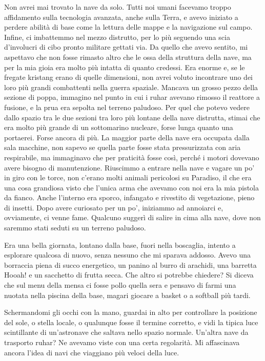 Non avrei mai trovato la nave da solo. Tutti noi umani facevamo troppo
affidamento sulla tecnologia avanzata, anche sulla Terra, e avevo
iniziato a perdere abilità di base come la lettura delle mappe e la
navigazione sul campo. Infine, ci imbattemmo nel mezzo distrutto, per lo
più seguendo una scia d'involucri di cibo pronto militare gettati via.
Da quello che avevo sentito, mi aspettavo che non fosse rimasto altro
che le ossa della struttura della nave, ma per la mia gioia era molto
più intatta di quanto credessi. Era enorme e, se le fregate kristang
erano di quelle dimensioni, non avrei voluto incontrare uno dei loro più
grandi combattenti nella guerra spaziale. Mancava un grosso pezzo della
sezione di poppa, immagino nel punto in cui i ruhar avevano rimosso il
reattore a fusione, e la prua era sepolta nel terreno paludoso. Per quel
che potevo vedere dallo spazio tra le due sezioni tra loro più lontane
della nave distrutta, stimai che era molto più grande di un sottomarino
nucleare, forse lunga quanto una portaerei. Forse ancora di più. La
maggior parte della nave era occupata dalla sala macchine, non sapevo se
quella parte fosse stata pressurizzata con aria respirabile, ma
immaginavo che per praticità fosse così, perché i motori dovevano avere
bisogno di manutenzione. Riuscimmo a entrare nella nave e vagare un po'
in giro con le torce, non c'erano molti animali pericolosi su Paradiso,
il che era una cosa grandiosa visto che l'unica arma che avevamo con noi
era la mia pistola da fianco. Anche l'interno era sporco, infangato e
rivestito di vegetazione, pieno di insetti. Dopo avere curiosato per un
po', iniziammo ad annoiarci e, ovviamente, ci venne fame. Qualcuno
suggerì di salire in cima alla nave, dove non saremmo stati seduti su un
terreno paludoso.

Era una bella giornata, lontano dalla base, fuori nella boscaglia,
intento a esplorare qualcosa di nuovo, senza nessuno che mi sparava
addosso. Avevo una borraccia piena di succo energetico, un panino al
burro di arachidi, una barretta Hooah! e un sacchetto di frutta secca.
Che altro si potrebbe chiedere? Si diceva che sul menu della mensa ci
fosse pollo quella sera e pensavo di farmi una nuotata nella piscina
della base, magari giocare a basket o a softball più tardi.

Schermandomi gli occhi con la mano, guardai in alto per controllare la
posizione del sole, o stella locale, o qualunque fosse il termine
corretto, e vidi la tipica luce scintillante di un'astronave che saltava
nello spazio normale. Un'altra nave da trasporto ruhar? Ne avevamo viste
con una certa regolarità. Mi affascinava ancora l'idea di navi che
viaggiano più veloci della luce.

